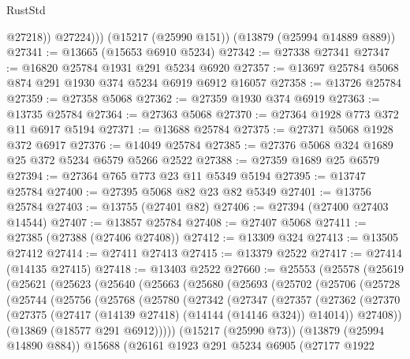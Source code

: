 \begin{lexlean}{RustStd}
\begin{coremodule}
              @27218))
          @27224)))
    (@15217 (@25990 @151))
    (@13879 (@25994 @14889 @889))
@27341 := @13665 (@15653 @6910 @5234)
@27342 := @27338 @27341
@27347 := @16820 @25784 @1931 @291 @5234 @6920
@27357 := @13697 @25784 @5068 @874 @291 @1930 @374 @5234 @6919 @6912 @16057
@27358 := @13726 @25784
@27359 := @27358 @5068
@27362 := @27359 @1930 @374 @6919
@27363 := @13735 @25784
@27364 := @27363 @5068
@27370 := @27364 @1928 @773 @372 @11 @6917 @5194
@27371 := @13688 @25784
@27375 := @27371 @5068 @1928 @372 @6917
@27376 := @14049 @25784
@27385 := @27376 @5068 @324 @1689 @25 @372 @5234 @6579 @5266 @2522
@27388 := @27359 @1689 @25 @6579
@27394 := @27364 @765 @773 @23 @11 @5349 @5194
@27395 := @13747 @25784
@27400 := @27395 @5068 @82 @23 @82 @5349
@27401 := @13756 @25784
@27403 := @13755 (@27401 @82)
@27406 := @27394 (@27400 @27403 @14544)
@27407 := @13857 @25784
@27408 := @27407 @5068
@27411 := @27385 (@27388 (@27406 @27408))
@27412 := @13309 @324
@27413 := @13505 @27412
@27414 := @27411 @27413
@27415 := @13379 @2522
@27417 := @27414 (@14135 @27415)
@27418 := @13403 @2522
@27660 := @25553
    (@25578
      (@25619
        (@25621
          (@25623
            (@25640
              (@25663
                (@25680
                  (@25693
                    (@25702
                      (@25706
                        (@25728
                          (@25744
                            (@25756
                              (@25768
                                (@25780
                                  (@27342
                                    (@27347
                                      (@27357
                                        (@27362
                                          (@27370
                                            (@27375
                                              (@27417
                                                (@14139 @27418)
                                                (@14144 (@14146 @324))
                                                @14014))
                                            @27408))
                                        (@13869 (@18577 @291 @6912)))))
                                  (@15217 (@25990 @73))
                                  (@13879 (@25994 @14890 @884))
                                  @15688
                                  (@26161
                                    @1923
                                    @291
                                    @5234
                                    @6905
                                    (@27177
                                      @1922

\end{coremodule}
\end{lexlean}
